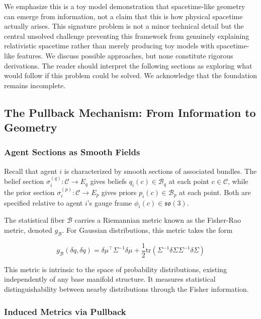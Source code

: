 \documentclass[11pt]{article}
\begin{document}
We emphasize this is a toy model demonstration that spacetime-like geometry can emerge from information, not a claim that this is how physical spacetime actually arises. This signature problem is not a minor technical detail but the central unsolved challenge preventing this framework from genuinely explaining relativistic spacetime rather than merely producing toy models with spacetime-like features. We discuss possible approaches, but none constitute rigorous derivations. The reader should interpret the following sections as exploring what would follow if this problem could be solved. We acknowledge that the foundation remains incomplete.

\subsection{The Pullback Mechanism: From Information to Geometry}

\subsubsection{Agent Sections as Smooth Fields}

Recall that agent $i$ is characterized by smooth sections of associated bundles. The belief section $\sigma_i^{(q)}: \mathcal{C} \to E_q$ gives beliefs $q_i(c) \in \mathcal{B}_q$ at each point $c \in \mathcal{C}$, while the prior section $\sigma_i^{(p)}: \mathcal{C} \to E_p$ gives priors $p_i(c) \in \mathcal{B}_p$ at each point. Both are specified relative to agent $i$'s gauge frame $\phi_i(c) \in \mathfrak{so}(3)$.

The statistical fiber $\mathcal{B}$ carries a Riemannian metric known as the Fisher-Rao metric, denoted $g_{\mathcal{B}}$. For Gaussian distributions, this metric takes the form

\begin{equation}
g_{\mathcal{B}}(\delta q, \delta q) = \delta\mu^\top \Sigma^{-1} \delta\mu + \frac{1}{2}\mathrm{tr}(\Sigma^{-1}\delta\Sigma\Sigma^{-1}\delta\Sigma)
\end{equation}

This metric is intrinsic to the space of probability distributions, existing independently of any base manifold structure. It measures statistical distinguishability between nearby distributions through the Fisher information.

\subsubsection{Induced Metrics via Pullback}
\end{document}

